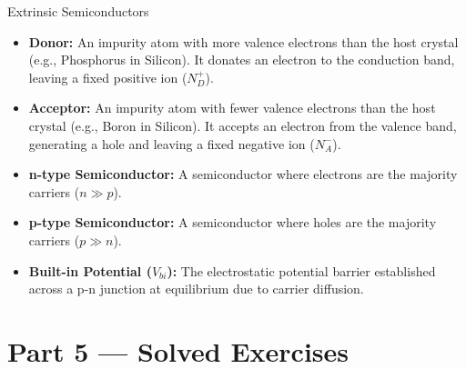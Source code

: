 \documentclass[12pt, a4paper]{book}
\newcommand{\important}[1]{\textcolor{ModuleColor}{\textbf{#1}}}
\begin{document}
\begin{namedconcept}{Extrinsic Semiconductors}
\begin{itemize}
  \item \important{Donor:} An impurity atom with more valence electrons than the host crystal (e.g., Phosphorus in Silicon). It donates an electron to the conduction band, leaving a fixed positive ion ($N_D^+$).
  \item \important{Acceptor:} An impurity atom with fewer valence electrons than the host crystal (e.g., Boron in Silicon). It accepts an electron from the valence band, generating a hole and leaving a fixed negative ion ($N_A^-$).
  \item \important{n-type Semiconductor:} A semiconductor where electrons are the majority carriers ($n \gg p$).
  \item \important{p-type Semiconductor:} A semiconductor where holes are the majority carriers ($p \gg n$).
  \item \important{Built-in Potential ($V_{bi}$):} The electrostatic potential barrier established across a p-n junction at equilibrium due to carrier diffusion.
\end{itemize}
\end{namedconcept}

\newpage

\section{Part 5 --- Solved Exercises}
\end{document}
